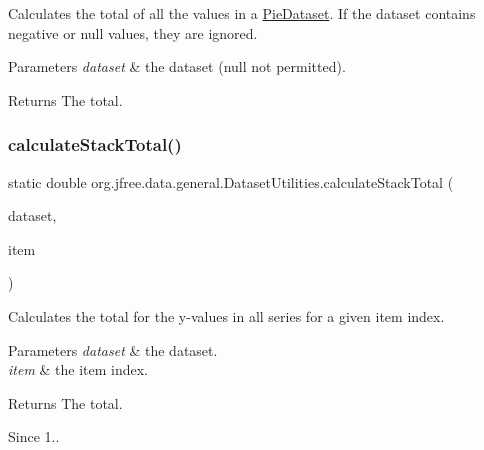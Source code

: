 Calculates the total of all the values in a \mbox{\hyperlink{interfaceorg_1_1jfree_1_1data_1_1general_1_1_pie_dataset}{Pie\+Dataset}}. If the dataset contains negative or {\ttfamily null} values, they are ignored.


\begin{DoxyParams}{Parameters}
{\em dataset} & the dataset ({\ttfamily null} not permitted).\\
\hline
\end{DoxyParams}
\begin{DoxyReturn}{Returns}
The total. 
\end{DoxyReturn}
\mbox{\label{classorg_1_1jfree_1_1data_1_1general_1_1_dataset_utilities_a53924f12fe537800f273248de14dcab6}} 
\subsubsection{\texorpdfstring{calculate\+Stack\+Total()}{calculateStackTotal()}}
{\footnotesize\ttfamily static double org.\+jfree.\+data.\+general.\+Dataset\+Utilities.\+calculate\+Stack\+Total (\begin{DoxyParamCaption}\item[{\mbox{\hyperlink{interfaceorg_1_1jfree_1_1data_1_1xy_1_1_table_x_y_dataset}{Table\+X\+Y\+Dataset}}}]{dataset,  }\item[{int}]{item }\end{DoxyParamCaption})\hspace{0.3cm}{\ttfamily [static]}}

Calculates the total for the y-\/values in all series for a given item index.


\begin{DoxyParams}{Parameters}
{\em dataset} & the dataset. \\
\hline
{\em item} & the item index.\\
\hline
\end{DoxyParams}
\begin{DoxyReturn}{Returns}
The total.
\end{DoxyReturn}
\begin{DoxySince}{Since}
1.. 
\end{DoxySince}
\mbox{\label{classorg_1_1jfree_1_1data_1_1general_1_1_dataset_utilities_a6e90c2bf6df7ba645d3d630e2ee053a2}} 

